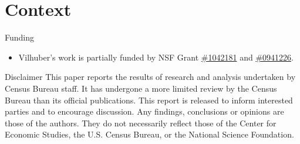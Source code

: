 \section{Context}
\begin{frame}
\begin{block}{Funding}
\begin{itemize}
\item Vilhuber's work is partially funded by NSF Grant 
\href{http://www.nsf.gov/awardsearch/showAward.do?AwardNumber=1042181}{\#1042181} 
and 
\href{http://www.nsf.gov/awardsearch/showAward.do?AwardNumber=0941226}{\#0941226}. 
\end{itemize}
\end{block}
\begin{block}{Disclaimer}
\small
This paper reports the results of research and analysis 
undertaken by Census Bureau staff. It has undergone a more limited review by the Census Bureau than its 
official publications. This report is released to inform interested parties and to encourage discussion. Any 
findings, conclusions or opinions are those of the authors. They do not necessarily reflect those of the Center for 
Economic Studies, the U.S. Census Bureau, or the National Science Foundation. 
\end{block}
\end{frame}


